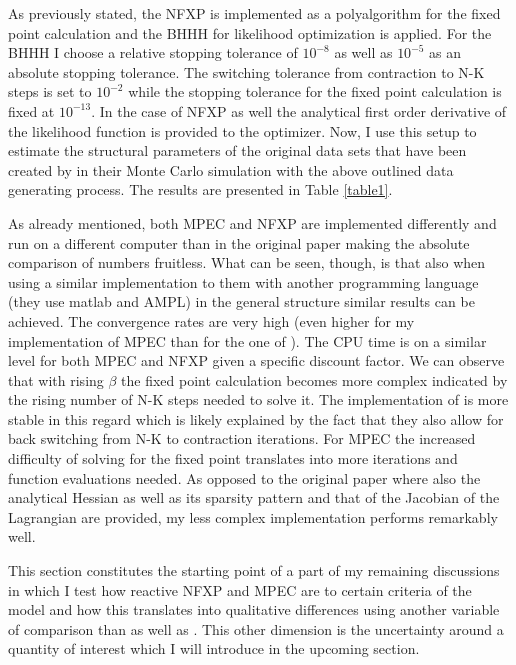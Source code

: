As previously stated, the NFXP is implemented as a polyalgorithm for the fixed point calculation and the BHHH for likelihood optimization is applied. For the BHHH I choose a relative stopping tolerance of $10^{-8}$ as well as $10^{-5}$ as an absolute stopping tolerance. The switching tolerance from contraction to N-K steps is set to $10^{-2}$ while the stopping tolerance for the fixed point calculation is fixed at $10^{-13}$. In the case of NFXP as well the analytical first order derivative of the likelihood function is provided to the optimizer. Now, I use this setup to estimate the structural parameters of the original data sets that have been created by \citeauthor{Iskhakov.2016} in their Monte Carlo simulation with the above outlined data generating process. The results are presented in Table \ref{table1}.

As already mentioned, both MPEC and NFXP are implemented differently and run on a different computer than in the original paper making the absolute comparison of numbers fruitless. What can be seen, though, is that also when using a similar implementation to them with another programming language (they use matlab and AMPL) in the general structure similar results can be achieved. The convergence rates are very high (even higher for my implementation of MPEC than for the one of \citeauthor{Iskhakov.2016}). The CPU time is on a similar level for both MPEC and NFXP given a specific discount factor. We can observe that with rising $\beta$ the fixed point calculation becomes more complex indicated by the rising number of N-K steps needed to solve it. The implementation of \cite{Iskhakov.2016} is more stable in this regard which is likely explained by the fact that they also allow for back switching from N-K to contraction iterations. For MPEC the increased difficulty of solving for the fixed point translates into more iterations and function evaluations needed. As opposed to the original paper where also the analytical Hessian as well as its sparsity pattern and that of the Jacobian of the Lagrangian are provided, my less complex implementation performs remarkably well.

This section constitutes the starting point of a part of my remaining discussions in which I test how reactive NFXP and MPEC are to certain criteria of the model and how this translates into qualitative differences using another variable of comparison than \cite{Su.Judd.2012} as well as \cite{Iskhakov.2016}. This other dimension is the uncertainty around a quantity of interest which I will introduce in the upcoming section.
